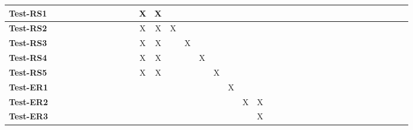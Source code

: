 \documentclass[12pt, titlepage]{article}
\begin{document}
\begin{landscape}
\begin{table}[H]
\begin{adjustwidth}{-0.1in}{-1in}
{\begin{tabular}{|c|c|c|c|c|c|c|c|c|c|c|c|c|c|c|c|c|l|l|l|l|l|l|l|l|l|l|l|l|l|l|l|l|l|l|l|l|}
\multicolumn{1}{|l|}{\textbf{Test-RS1}}   &             &             &             &              &             &              &              &             &              &              &              X&              X&              &              &              &                & & & & & & & & & & & & & & & & & & & &\\ \hline
\multicolumn{1}{|l|}{\textbf{Test-RS2}}   &             &             &             &             &             &             &              &             &              &              &             X&              X&             X&             &              &                & & & & & & & & & & & & & & & & & & & & \\ \hline
\multicolumn{1}{|l|}{\textbf{Test-RS3}}   &             &             &             &              &             &              &             &             &              &              &              X&              X&              &              X&              &                & & & & & & & & & & & & & & & & & & & &\\ \hline
\multicolumn{1}{|l|}{\textbf{Test-RS4}}   &             &             &             &             &             &              &             &             &              &              &             X&              X&              &             &              X&                & & & & & & & & & & & & & & & & & & & &\\ \hline
\multicolumn{1}{|l|}{\textbf{Test-RS5}}   &             &             &             &              &             &              &              &             &              &              &             X&              X&              &             &              &                X& & & & & & & & & & & & & & & & & & & &\\ \hline
\multicolumn{1}{|l|}{\textbf{Test-ER1}}   &             &             &             &              &             &              &              &             &              &              &             &              &              &             &              &                & X& & & & & & & & & & & & & & & & & & &\\ \hline
\multicolumn{1}{|l|}{\textbf{Test-ER2}}   &             &             &             &              &             &             &             &             &              &              &              &              &              &              &              &               & & X& X& & & & & & & & & & & & & & & & &\\ \hline
\multicolumn{1}{|l|}{\textbf{Test-ER3}}   &              &             &             &              &              &              &              &             &             &             &              &              &             &             &             &                & & & X& & & & & & & & & & & & & & & & &\\ \hline

\end{tabular}}
\end{adjustwidth}
\end{table}
\end{landscape}
\end{document}
